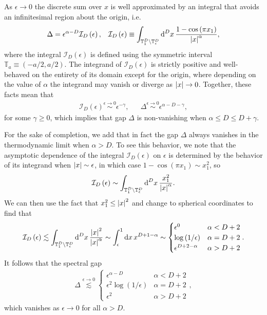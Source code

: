 \documentclass[nofootinbib,notitlepage,11pt]{revtex4-2}
\newcommand{\f}[2]{\dfrac{#1}{#2}} %
\newcommand{\p}[1]{\left(#1\right)} %
\newcommand{\1}{\mathds{1}}
\renewcommand{\d}{\text{d}}
\newcommand{\I}{\mathcal{I}}
\newcommand{\TT}{\mathbb{T}}
\begin{document}
As $\epsilon\to0$ the discrete sum over $x$ is well approximated by an
integral that avoids an infinitesimal region about the origin, i.e.
\begin{align}
  \Delta = \epsilon^{\alpha-D} \I_D\p{\epsilon},
  &&
  \I_D\p{\epsilon}
  \equiv \int_{\TT_1^D\setminus\TT_\epsilon^D} \d^Dx\,
  \f{1-\cos\p{\pi x_1}}{\abs{x}^\alpha},
\end{align}
where the integral $\I_D\p{\epsilon}$ is defined using the symmetric
interval $\TT_a\equiv\p{-a/2,a/2}$.  The integrand of
$\I_D\p{\epsilon}$ is strictly positive and well-behaved on the
entirety of its domain except for the origin, where depending on the
value of $\alpha$ the integrand may vanish or diverge as
$\abs{x}\to0$.  Together, these facts mean that
\begin{align}
  \I_D\p{\epsilon} \stackrel{\epsilon\to0}{\sim} \epsilon^{-\gamma},
  &&
  \Delta \stackrel{\epsilon\to0}{\sim} \epsilon^{\alpha-D-\gamma},
\end{align}
for some $\gamma\ge0$, which implies that gap $\Delta$ is
non-vanishing when $\alpha\le D\le D+\gamma$.

For the sake of completion, we add that in fact the gap $\Delta$
always vanishes in the thermodynamic limit when $\alpha>D$.  To see
this behavior, we note that the asymptotic dependence of the integral
$\I_D\p{\epsilon}$ on $\epsilon$ is determined by the behavior of its
integrand when $\abs{x}\sim\epsilon$, in which case
$1-\cos\p{\pi x_1}\sim x_1^2$, so
\begin{align}
  \I_D\p{\epsilon}
  \sim \int_{\TT_1^D\setminus\TT_\epsilon^D} \d^Dx\,
  \f{x_1^2}{\abs{x}^\alpha}.
\end{align}
We can then use the fact that $x_1^2\le\abs{x}^2$ and change to
spherical coordinates to find that
\begin{align}
  \I_D\p{\epsilon} \lesssim
  \int_{\TT_1^D\setminus\TT_\epsilon^D} \d^Dx\,
  \f{\abs{x}^2}{\abs{x}^\alpha}
  \sim \int_\epsilon^1 \d x\, x^{D+1-\alpha}
  \sim
  \begin{cases}
    \epsilon^0 & \alpha < D+2 \\
    \log\p{1/\epsilon} & \alpha = D+2 \\
    \epsilon^{D+2-\alpha} & \alpha > D+2
  \end{cases}.
\end{align}
It follows that the spectral gap
\begin{align}
  \Delta \stackrel{\epsilon\to0}{\lesssim}
  \begin{cases}
    \epsilon^{\alpha-D} & \alpha < D+2 \\
    \epsilon^2 \log\p{1/\epsilon} & \alpha = D + 2 \\
    \epsilon^2 & \alpha > D+2
  \end{cases},
\end{align}
which vanishes as $\epsilon\to0$ for all $\alpha>D$.
\end{document}
